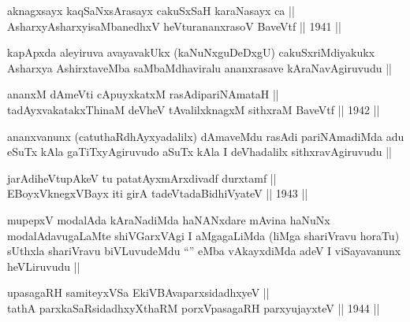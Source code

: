 
\begin{shl}
aknagxsayx kaqSaNxsArasayx cakuSxSaH karaNasayx ca || \\
AsharxyAsharxyisaMbanedhxV heVturananxrasoV BaveVtf ||  1941 ||  
\end{shl}

\begin{artha}
kapApxda aleyiruva avayavakUkx (kaNuNxguDeDxgU) cakuSxriMdiyakukx
Asharxya AshirxtaveMba saMbaMdhaviralu ananxrasave kAraNavAgiruvudu ||
\end{artha}


\begin{shl}
ananxM dAmeVti cApuyxkatxM rasAdipariNAmataH || \\
tadAyxvakatakxThinaM deVheV tAvalilxknagxM sithxraM BaveVtf ||  1942 ||  
\end{shl}

\begin{artha}
ananxvanunx (catuthaRdhAyxyadalilx) dAmaveMdu rasAdi pariNAmadiMda adu
eSuTx kAla gaTiTxyAgiruvudo aSuTx kAla I deVhadalilx sithxravAgiruvudu ||
\end{artha}


\begin{shl}
jarAdiheVtupAkeV tu patatAyxmArxdivadf durxtamf || \\
EBoyxV\s knegxVBayx iti girA tadeVtadaBidhiVyateV ||  1943 ||  
\end{shl}

\begin{artha}
mupepxV modalAda kAraNadiMda haNANxdare mAvina haNuNx
modalAdavugaLaMte shiVGarxVAgi I aMgagaLiMda (liMga shariVravu horaTu)
sUthxla shariVravu biVLuvudeMdu ``\stext'' eMba vAkayxdiMda adeV I
viSayavanunx heVLiruvudu ||
\end{artha}


\begin{shl}
upasagaRH samiteyxVSa EkiVBAvaparxsidadhxyeV || \\
tathA parxkaSaRsidadhxyXthaRM porxVpasagaRH parxyujayxteV ||  1944 ||  
\end{shl}

